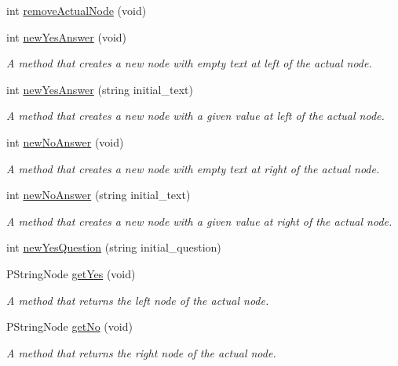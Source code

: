 \begin{DoxyCompactItemize}
int \hyperlink{classGameEngine_a17f5e4446691b4b49946aa5246e9c745}{remove\+Actual\+Node} (void)
\item 
int \hyperlink{classGameEngine_a60f59ad9d986518c2b02395e1141762c}{new\+Yes\+Answer} (void)
\begin{DoxyCompactList}\small\item\em A method that creates a new node with empty text at left of the actual node. \end{DoxyCompactList}\item 
int \hyperlink{classGameEngine_aa9ffb7adbdb70bdd8b443969a016c4be}{new\+Yes\+Answer} (string initial\+\_\+text)
\begin{DoxyCompactList}\small\item\em A method that creates a new node with a given value at left of the actual node. \end{DoxyCompactList}\item 
int \hyperlink{classGameEngine_af56b409af16473edc6c8e8fac73f251c}{new\+No\+Answer} (void)
\begin{DoxyCompactList}\small\item\em A method that creates a new node with empty text at right of the actual node. \end{DoxyCompactList}\item 
int \hyperlink{classGameEngine_ad3f74526d6de45dd90dbb3e4f6e3807e}{new\+No\+Answer} (string initial\+\_\+text)
\begin{DoxyCompactList}\small\item\em A method that creates a new node with a given value at right of the actual node. \end{DoxyCompactList}\item 
int \hyperlink{classGameEngine_a3a21ccb76962cf94f932b3f837d7977f}{new\+Yes\+Question} (string initial\+\_\+question)
\item 
P\+String\+Node \hyperlink{classGameEngine_ab3f646b7979c18693707356bb2bbea19}{get\+Yes} (void)
\begin{DoxyCompactList}\small\item\em A method that returns the left node of the actual node. \end{DoxyCompactList}\item 
P\+String\+Node \hyperlink{classGameEngine_a55fea2d808bae3ce0ef6d07e0c430c75}{get\+No} (void)
\begin{DoxyCompactList}\small\item\em A method that returns the right node of the actual node. \end{DoxyCompactList}\item 

\end{DoxyCompactItemize}
